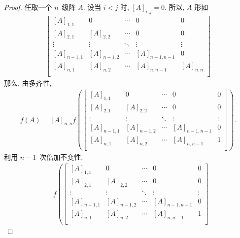 \documentclass[../libro.tex]{subfiles}
\begin{document}
\begin{proof}
    任取一个 \(n\)~级阵 \(A\).
    设当 \(i < j\) 时, \([A]_{i,j} = 0\).
    所以, \(A\) 形如
    \begin{align*}
        \begin{bmatrix}
            [A]_{1,1}   & 0           & \cdots & 0             & 0         \\
            [A]_{2,1}   & [A]_{2,2}   & \cdots & 0             & 0         \\
            \vdots      & \vdots      & \ddots & \vdots        & \vdots    \\
            [A]_{n-1,1} & [A]_{n-1,2} & \cdots & [A]_{n-1,n-1} & 0         \\
            [A]_{n,1}   & [A]_{n,2}   & \cdots & [A]_{n,n-1}   & [A]_{n,n} \\
        \end{bmatrix}
    \end{align*}
    那么, 由多齐性,
    \begin{align*}
        f(A) = [A]_{n,n}
        f\left(
            \begin{bmatrix}
                [A]_{1,1}   & 0           & \cdots & 0             & 0      \\
                [A]_{2,1}   & [A]_{2,2}   & \cdots & 0             & 0      \\
                \vdots      & \vdots      & \ddots & \vdots        & \vdots \\
                [A]_{n-1,1} & [A]_{n-1,2} & \cdots & [A]_{n-1,n-1} & 0      \\
                [A]_{n,1}   & [A]_{n,2}   & \cdots & [A]_{n,n-1}   & 1      \\
            \end{bmatrix}
        \right).
    \end{align*}
    利用 \(n-1\)~次倍加不变性,
    \begin{align*}
        &
        f\left(
            \begin{bmatrix}
                [A]_{1,1}   & 0           & \cdots & 0             & 0      \\
                [A]_{2,1}   & [A]_{2,2}   & \cdots & 0             & 0      \\
                \vdots      & \vdots      & \ddots & \vdots        & \vdots \\
                [A]_{n-1,1} & [A]_{n-1,2} & \cdots & [A]_{n-1,n-1} & 0      \\
                [A]_{n,1}   & [A]_{n,2}   & \cdots & [A]_{n,n-1}   & 1      \\

\end{bmatrix}
\end{align*}
\end{proof}
\end{document}
